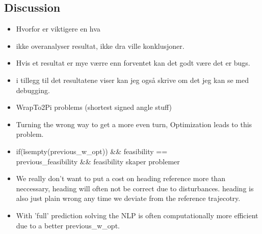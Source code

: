 

\subsection{Discussion}
\begin{itemize}
    \item Hvorfor er viktigere en hva
    \item ikke overanalyser resultat, ikke dra ville konklusjoner.
    \item Hvis et resultat er mye værre enn forventet kan det godt være det er bugs.
    \item i tillegg til det resultatene viser kan jeg også skrive om det jeg kan se med debugging.
    \item WrapTo2Pi problems (shortest signed angle stuff)
    \item Turning the wrong way to get a more even turn, Optimization leads to this problem. 
    \item if(\~isempty(previous\_w\_opt)) \&\& feasibility == \\
     previous\_feasibility \&\& feasibility     skaper problemer 
    \item We really don't want to put a cost on heading reference more than neccessary, heading will often not be correct due to disturbances.
    heading is also just plain wrong any time we deviate from the reference trajecotry.
    \item With 'full' prediction solving the NLP is often computationally more efficient due to a better previous\_w\_opt.
\end{itemize}

